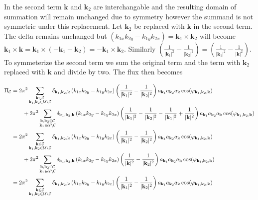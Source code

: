 \documentclass[9pt]{article}
\newcommand{\bfk}{\mathbf{k}}								%
\newcommand{\bfkn}[1]{\mathbf{k}_{#1}}								%
\begin{document}
In the second term $\bfk$ and $\bfkn{2}$ are interchangable and the resulting domain of summation will remain unchanged due to symmetry however the summand is not symmetric under this replacement. Let $\bfkn{2}$ be replaced with $\bfk$ in the second term. The delta remains unchanged but $(k_{1x}k_{2y} - k_{1y}k_{2x}) = \bfkn{1} \times \bfkn{2}$ will become $\bfkn{1} \times \bfk = \bfkn{1} \times (-\bfkn{1} - \bfkn{2}) = -\bfkn{1} \times \bfkn{2}$. Similarly $\left(\frac{1}{|\bfkn{1}|^2} - \frac{1}{|\bfkn{2}|^2}\right) = \left(\frac{1}{|\bfkn{1}|^2} - \frac{1}{|\bfk|^2}\right)$. To symmeterize the second term we sum the original term and the term with $\bfkn{2}$ replaced with $\bfk$ and divide by two. The flux then becomes

\begin{align}
\Pi_{\mathcal{C}} &= 2\pi^2	\sum_{\substack{\bfk \in \mathcal{C} \notag\\ \bfkn{1},  \bfkn{2} \in \mathcal{U}\setminus \mathcal{C}}}\delta_{\bfkn{1}, \bfkn{2},\bfk}\left(k_{1x}k_{2y} - k_{1y}k_{2x}\right) \left(\frac{1}{|\bfkn{1}|^2} - \frac{1}{|\bfkn{2}|^2}\right) a_{\bfkn{1}} a_{\bfkn{2}} a_{\bfk} \cos(\varphi_{\bfkn{1}, \bfkn{2}, \bfk}) \\ 
&\qquad   + 2\pi^2	\sum_{\substack{\bfk,  \bfkn{2} \in \mathcal{C} \\  \bfkn{1} \in \mathcal{U}\setminus \mathcal{C}}}\delta_{\bfkn{1}, \bfkn{2},\bfk}\left(k_{1x}k_{2y} - k_{1y}k_{2x}\right) \left(\frac{1}{|\bfkn{1}|^2} - \frac{1}{|\bfkn{2}|^2} - \frac{1}{|\bfkn{1}|^2} + \frac{1}{|\bfk|^2}\right) a_{\bfkn{1}} a_{\bfkn{2}} a_{\bfk} \cos(\varphi_{\bfkn{1}, \bfkn{2}, \bfk}) \notag\\ 
&= 2\pi^2	\sum_{\substack{\bfk \in \mathcal{C} \\ \bfkn{1},  \bfkn{2} \in \mathcal{U}\setminus \mathcal{C}}}\delta_{\bfkn{1}, \bfkn{2},\bfk}\left(k_{1x}k_{2y} - k_{1y}k_{2x}\right) \left(\frac{1}{|\bfkn{1}|^2} - \frac{1}{|\bfkn{2}|^2}\right) a_{\bfkn{1}} a_{\bfkn{2}} a_{\bfk} \cos(\varphi_{\bfkn{1}, \bfkn{2}, \bfk})  \notag\\ 
&\qquad   + 2\pi^2	\sum_{\substack{\bfk, \bfkn{2} \in \mathcal{C} \\  \bfkn{1} \in \mathcal{U}\setminus \mathcal{C}}}\delta_{\bfkn{1}, \bfkn{2},\bfk}\left(k_{1x}k_{2y} - k_{1y}k_{2x}\right) \left(\frac{1}{|\bfk|^2} - \frac{1}{|\bfkn{2}|^2}\right) a_{\bfkn{1}} a_{\bfkn{2}} a_{\bfk} \cos(\varphi_{\bfkn{1}, \bfkn{2}, \bfk}) \notag \\ 
&= 2\pi^2	\sum_{\substack{\bfk \in \mathcal{C} \\ \bfkn{1},  \bfkn{2} \in \mathcal{U}\setminus \mathcal{C}}}\delta_{\bfkn{1}, \bfkn{2},\bfk}\left(k_{1x}k_{2y} - k_{1y}k_{2x}\right) \left(\frac{1}{|\bfkn{1}|^2} - \frac{1}{|\bfkn{2}|^2}\right) a_{\bfkn{1}} a_{\bfkn{2}} a_{\bfk} \cos(\varphi_{\bfkn{1}, \bfkn{2}, \bfk})  \notag\\ 

\end{align}
\end{document}
